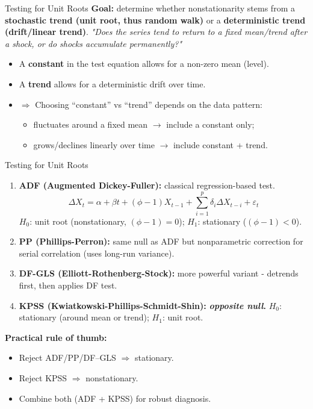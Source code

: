 \documentclass{beamer}
\begin{document}
\begin{frame}{Testing for Unit Roots}
\small
\textbf{Goal:} determine whether nonstationarity stems from a\textbf{ stochastic trend (unit root, thus random walk)} or a \textbf{deterministic trend (drift/linear trend)}.\textit{ 
\medskip
"Does the series tend to return to a fixed mean/trend after a shock, or do shocks accumulate permanently?"}

\vspace{0.3cm}
\begin{itemize}
  \item A \textbf{constant} in the test equation allows for a non-zero mean (level).
  \item A \textbf{trend} allows for a deterministic drift over time.
  \item $\Rightarrow$ Choosing “constant” vs “trend” depends on the data pattern:
  \begin{itemize}
    \item fluctuates around a fixed mean $\to$ include a constant only;
    \item grows/declines linearly over time $\to$ include constant + trend.
  \end{itemize}
\end{itemize}
\end{frame}


\begin{frame}{Testing for Unit Roots}
\small

\begin{enumerate}
  \item \textbf{ADF (Augmented Dickey-Fuller):} classical regression-based test.  
\[
\Delta X_t = \alpha + \beta t + (\phi - 1) X_{t-1} + \sum_{i=1}^{p}\delta_i \Delta X_{t-i} + \varepsilon_t
\]
  $H_0$: unit root (nonstationary, $ (\phi -1) = 0$); $H_1$: stationary ($ (\phi - 1) < 0$).
  
  \item \textbf{PP (Phillips-Perron):} same null as ADF but nonparametric correction for serial correlation (uses long-run variance).

  \item \textbf{DF-GLS (Elliott-Rothenberg-Stock):} more powerful variant - detrends first, then applies DF test.

  \item \textbf{KPSS (Kwiatkowski-Phillips-Schmidt-Shin):} \textbf{\textit{opposite null}.  }
  $H_0$: stationary (around mean or trend); $H_1$: unit root.
\end{enumerate}

\textbf{Practical rule of thumb:}
\begin{itemize}
  \item Reject ADF/PP/DF–GLS $\Rightarrow$ stationary.
  \item Reject KPSS $\Rightarrow$ nonstationary.
  \item Combine both (ADF + KPSS) for robust diagnosis.
\end{itemize}
\end{frame}
\end{document}
